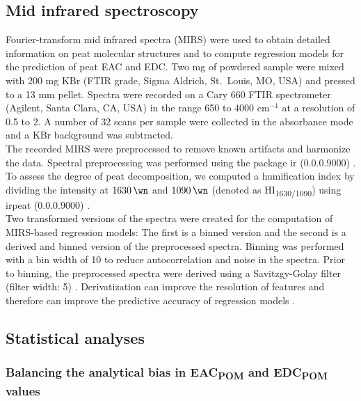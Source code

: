 \documentclass[draft,linenumbers]{agujournal2018}
\begin{document}
\subsection{Mid infrared spectroscopy}

Fourier-transform mid infrared spectra (MIRS) were used to obtain
detailed information on peat molecular structures and to compute
regression models for the prediction of peat EAC and EDC. Two mg of
powdered sample were mixed with 200 mg KBr (FTIR grade, Sigma Aldrich,
St.~Louis, MO, USA) and pressed to a 13 mm pellet. Spectra were recorded
on a Cary 660 FTIR spectrometer (Agilent, Santa Clara, CA, USA) in the
range 650 to 4000 cm\(^{-1}\) at a resolution of 0.5 to \SI{2}{\wn}. A
number of 32 scans per sample were collected in the absorbance mode and
a KBr background was subtracted.\\
The recorded MIRS were preprocessed to remove known artifacts and
harmonize the data. Spectral preprocessing was performed using the
package ir (0.0.0.9000) \citep{Teickner.2020}. To assess the degree of
peat decomposition, we computed a humification index by dividing the
intensity at \(\SI{1630}{\wn}\) and \(\SI{1090}{\wn}\) (denoted as
HI\textsubscript{1630/1090}) \citep{Broder.2012} using irpeat
(0.0.0.9000) \citep{Teickner.2020b}.\\
Two transformed versions of the spectra were created for the computation
of MIRS-based regression models: The first is a binned version and the
second is a derived and binned version of the preprocessed spectra.
Binning was performed with a bin width of \SI{10}{\wn} to reduce
autocorrelation and noise in the spectra. Prior to binning, the
preprocessed spectra were derived using a Savitzgy-Golay filter (filter
width: \SI{5}{\wn}) \citep{signaldevelopers.2014}. Derivatization can
improve the resolution of features and therefore can improve the
predictive accuracy of regression models
\citep{Stuart.2005, Engel.2013}.

\subsection{Statistical analyses}

\subsubsection{\texorpdfstring{Balancing the analytical bias in
EAC\textsubscript{POM} and EDC\textsubscript{POM}
values}{Balancing the analytical bias in EAC and EDC values}}
\end{document}
